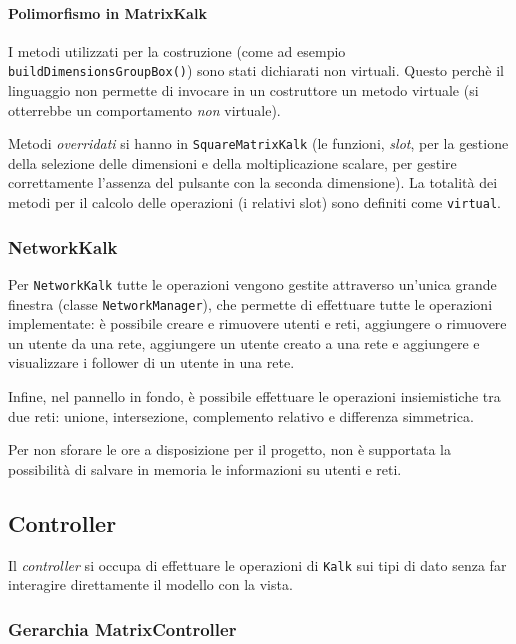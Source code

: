 \paragraph{Polimorfismo in MatrixKalk} I metodi utilizzati per la costruzione (come ad esempio \texttt{buildDimensionsGroupBox()}) sono 
stati dichiarati non virtuali. Questo
perchè il linguaggio non permette di invocare in un costruttore un metodo virtuale (si otterrebbe un comportamento \emph{non} virtuale). \par
Metodi \emph{overridati} si hanno in \texttt{SquareMatrixKalk} (le funzioni, \emph{slot}, per la gestione della selezione delle dimensioni
e della moltiplicazione scalare, per gestire correttamente l'assenza del pulsante con la seconda dimensione). La totalità dei 
metodi per il calcolo delle operazioni (i relativi slot) sono definiti come \texttt{virtual}.

\subsubsection{NetworkKalk}
Per \texttt{NetworkKalk} tutte le operazioni vengono gestite attraverso un'unica grande finestra (classe \texttt{NetworkManager}), che permette di 
effettuare tutte le operazioni implementate:
è possibile creare e rimuovere utenti e reti, aggiungere o rimuovere un utente da una rete, aggiungere un utente creato a una rete e aggiungere e visualizzare i follower di un utente in una rete.\par
Infine, nel pannello in fondo, è possibile effettuare le operazioni insiemistiche tra due reti: unione, intersezione, complemento relativo e differenza simmetrica.\par
Per non sforare le ore a disposizione per il progetto, non è supportata la possibilità di 
salvare in memoria le informazioni su utenti e reti.

\subsection{Controller}

Il \emph{controller} si occupa di effettuare le operazioni di \texttt{Kalk} sui tipi di dato senza far interagire direttamente il modello con la vista.

\subsubsection{Gerarchia MatrixController}

